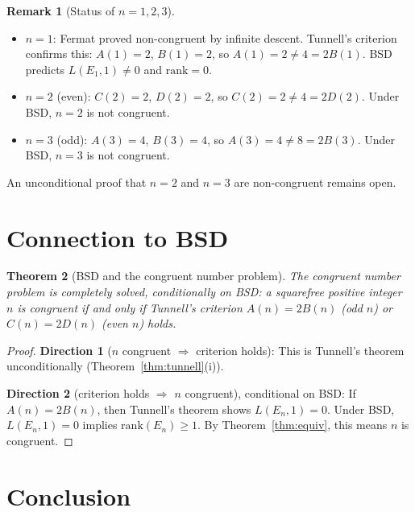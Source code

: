 \documentclass[12pt,a4paper]{amsart}
\newtheorem{theorem}{Theorem}[section]
\theoremstyle{definition}
\newtheorem{remark}[theorem]{Remark}
\begin{document}
\begin{remark}[Status of $n = 1, 2, 3$]
\begin{itemize}
  \item $n=1$: Fermat proved non-congruent by infinite descent.
    Tunnell's criterion confirms this: $A(1) = 2$, $B(1) = 2$,
    so $A(1) = 2 \ne 4 = 2B(1)$.  BSD predicts $L(E_1,1) \ne 0$ and $\mathrm{rank}=0$.
  \item $n=2$ (even): $C(2) = 2$, $D(2) = 2$, so $C(2) = 2 \ne 4 = 2D(2)$.
    Under BSD, $n=2$ is not congruent.
  \item $n=3$ (odd): $A(3) = 4$, $B(3) = 4$, so $A(3) = 4 \ne 8 = 2B(3)$.
    Under BSD, $n=3$ is not congruent.
\end{itemize}
An unconditional proof that $n=2$ and $n=3$ are non-congruent remains open.
\end{remark}

\section{Connection to BSD}

\begin{theorem}[BSD and the congruent number problem]
\label{thm:bsd_cong}
The congruent number problem is completely solved, conditionally on BSD:
a squarefree positive integer $n$ is congruent if and only if
Tunnell's criterion $A(n) = 2B(n)$ (odd $n$) or $C(n) = 2D(n)$ (even $n$)
holds.
\end{theorem}

\begin{proof}
\textbf{Direction 1} ($n$ congruent $\Rightarrow$ criterion holds):
This is Tunnell's theorem unconditionally (Theorem~\ref{thm:tunnell}(i)).

\textbf{Direction 2} (criterion holds $\Rightarrow$ $n$ congruent),
conditional on BSD:
If $A(n) = 2B(n)$, then Tunnell's theorem shows $L(E_n,1) = 0$.
Under BSD, $L(E_n,1) = 0$ implies $\mathrm{rank}(E_n) \ge 1$.
By Theorem~\ref{thm:equiv}, this means $n$ is congruent.
\end{proof}

\section{Conclusion}
\end{document}
